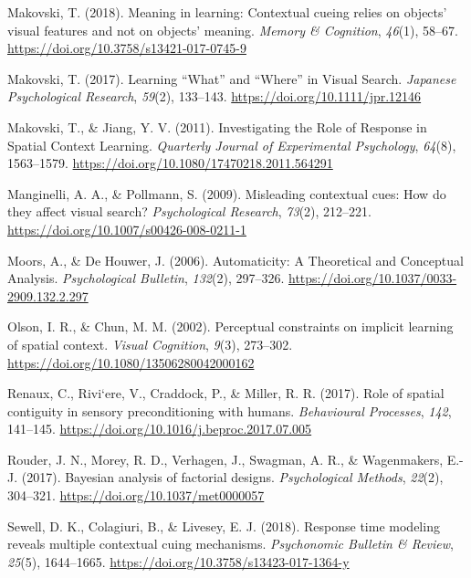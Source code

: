\documentclass[
  man,floatsintext]{apa7}
\newlength{\cslhangindent}
\newlength{\cslentryspacingunit} %
\newenvironment{CSLReferences}[2] %
 {%
  \setlength{\parindent}{0pt}
  \ifodd #1
  \let\oldpar\par
  \def\par{\hangindent=\cslhangindent\oldpar}
  \fi
  \setlength{\parskip}{#2\cslentryspacingunit}
 }%
 {}
\begin{document}
\begin{CSLReferences}{1}{0}
\leavevmode{}%
Makovski, T. (2018). Meaning in learning: {Contextual} cueing relies on objects' visual features and not on objects' meaning. \emph{Memory \& Cognition}, \emph{46}(1), 58--67. \url{https://doi.org/10.3758/s13421-017-0745-9}

\leavevmode{}%
Makovski, T. (2017). Learning {``{What}''} and {``{Where}''} in {Visual Search}. \emph{Japanese Psychological Research}, \emph{59}(2), 133--143. \url{https://doi.org/10.1111/jpr.12146}

\leavevmode{}%
Makovski, T., \& Jiang, Y. V. (2011). Investigating the {Role} of {Response} in {Spatial Context Learning}. \emph{Quarterly Journal of Experimental Psychology}, \emph{64}(8), 1563--1579. \url{https://doi.org/10.1080/17470218.2011.564291}

\leavevmode{}%
Manginelli, A. A., \& Pollmann, S. (2009). Misleading contextual cues: {How} do they affect visual search? \emph{Psychological Research}, \emph{73}(2), 212--221. \url{https://doi.org/10.1007/s00426-008-0211-1}

\leavevmode{}%
Moors, A., \& De Houwer, J. (2006). Automaticity: {A Theoretical} and {Conceptual Analysis}. \emph{Psychological Bulletin}, \emph{132}(2), 297--326. \url{https://doi.org/10.1037/0033-2909.132.2.297}

\leavevmode{}%
Olson, I. R., \& Chun, M. M. (2002). Perceptual constraints on implicit learning of spatial context. \emph{Visual Cognition}, \emph{9}(3), 273--302. \url{https://doi.org/10.1080/13506280042000162}

\leavevmode{}%
Renaux, C., Rivi`ere, V., Craddock, P., \& Miller, R. R. (2017). Role of spatial contiguity in sensory preconditioning with humans. \emph{Behavioural Processes}, \emph{142}, 141--145. \url{https://doi.org/10.1016/j.beproc.2017.07.005}

\leavevmode{}%
Rouder, J. N., Morey, R. D., Verhagen, J., Swagman, A. R., \& Wagenmakers, E.-J. (2017). Bayesian analysis of factorial designs. \emph{Psychological Methods}, \emph{22}(2), 304--321. \url{https://doi.org/10.1037/met0000057}

\leavevmode{}%
Sewell, D. K., Colagiuri, B., \& Livesey, E. J. (2018). Response time modeling reveals multiple contextual cuing mechanisms. \emph{Psychonomic Bulletin \& Review}, \emph{25}(5), 1644--1665. \url{https://doi.org/10.3758/s13423-017-1364-y}


\end{CSLReferences}
\end{document}
